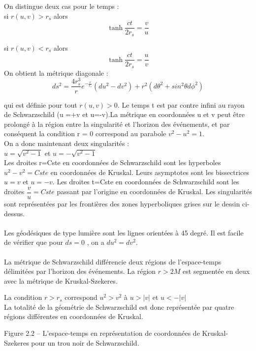 On distingue deux cas pour le temps :\\
si $r(u,v)>r_{s}$ alors 
\begin{equation}
\tanh\dfrac{ct}{2r_{s}}=\dfrac{v}{u}
\end{equation}

si $r(u,v)<r_{s}$ alors 
\begin{equation}
\tanh\dfrac{ct}{2r_{s}}=\dfrac{u}{v}
\end{equation}
On obtient la métrique diagonale :
\begin{equation}
ds^{2}=\dfrac{4r_{s}^{3}}{r}e^{-\frac{r}{r_{s}}}(du^{2}-dv^{2})+r^{2}(d\theta^{2}+sin^{2}\theta d\phi^{2})
\end{equation}

qui est définie pour tout  $r(u,v)>0$. Le temps t est par contre infini au rayon de Schwarzschild (u =+v  et  u=-v).La métrique en coordonnées u et v peut être prolongé à la région entre
la singularité et l’horizon des événements, et par conséquent la condition r = 0 correspond au
parabole $ v^{2}-u^{2} = 1$.\\
On a donc maintenant deux singularités : \\
$u=\sqrt{v^{2}-1}$ et $u=-\sqrt{v^{2}-1}$\\
Les droites  r=Cste en coordonnées de Schwarzschild sont les hyperboles\\ $ u^{2}-v^{2}=Cste$ en coordonnées de Kruskal. Leurs asymptotes sont les bissectrices $ u=v$ et $ u=-v$. Les droites  t=Cste en coordonnées de Schwarzschild sont les droites $ \dfrac{v}{u}=Cste$ passant par l'origine en coordonnées de Kruskal. Les singularités sont représentées par les frontières des zones hyperboliques grises sur le dessin ci-dessus.\\
\\
Les géodésiques de type lumière sont les lignes orientées à 45 degré. Il est facile de vérifier que pour  $ds=0$ , on a $ du^{2}=dv^{2}$.\\
\\
La métrique de Schwarzschild différencie deux régions de l'espace-temps délimitées par l'horizon des événements. La région $ r>2M$ est segmentée en deux avec la métrique de Kruskal-Szekeres.

La condition $ r>r_{s}$ correspond $ u^{2}>v^{2}$ à $ u>|v|$ et $u<-|v|$\\
La totalité de la géométrie de Schwarzschild est donc représentée par quatre régions différentes en coordonnées de Kruskal.
\begin{center}
	
\end{center}
Figure 2.2 – L’espace-temps en représentation de coordonnées de Kruskal-Szekeres
pour un trou noir de Schwarzschild.

